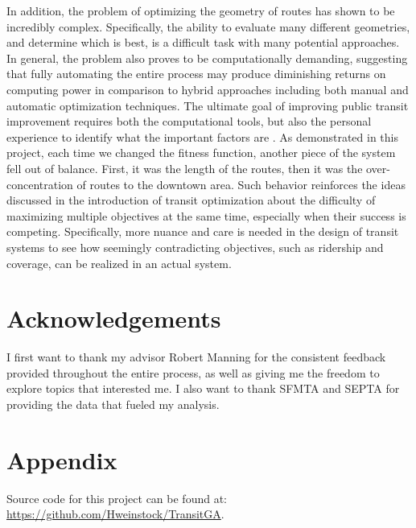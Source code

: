 \documentclass[11pt]{amsart}
\theoremstyle{definition}                  %
\theoremstyle{remark}                       %
\numberwithin{equation}{section}
\begin{document}
In addition, the problem of optimizing the geometry of routes has shown to be incredibly complex. Specifically, the ability to evaluate many different geometries, and determine which is best, is a difficult task with many potential approaches. In general, the problem also proves to be computationally demanding, suggesting that fully automating the entire process may produce diminishing returns on computing power in comparison to hybrid approaches including both manual and automatic optimization techniques. The ultimate goal of improving public transit improvement requires both the computational tools, but also the personal experience to identify what the important factors are \cite{fitzgerald2022}. As demonstrated in this project, each time we changed the fitness function, another piece of the system fell out of balance. First, it was the length of the routes, then it was the over-concentration of routes to the downtown area. Such behavior reinforces the ideas discussed in the introduction of transit optimization about the difficulty of maximizing multiple objectives at the same time, especially when their success is competing. Specifically, more nuance and care is needed in the design of transit systems to see how seemingly contradicting objectives, such as ridership and coverage, can be realized in an actual system. 
\section*{Acknowledgements}
I first want to thank my advisor Robert Manning for the consistent feedback provided throughout the entire process, as well as giving me the freedom to explore topics that interested me. I also want to thank SFMTA and SEPTA for providing the data that fueled my analysis. 
\section*{Appendix}
Source code for this project can be found at: \url{https://github.com/Hweinstock/TransitGA}.

\printbibliography
\end{document}
